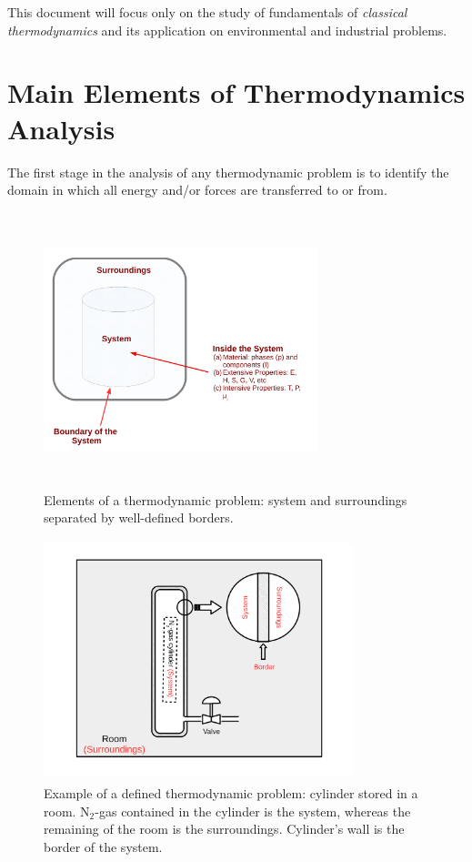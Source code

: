    This document will focus only on the study of fundamentals of {\it classical thermodynamics} and its application on environmental and industrial problems. 

   \section{Main Elements of Thermodynamics Analysis}\label{Chapter:Introduction:Section:ThermodAnalysis}

   The first stage in the analysis of any thermodynamic problem is to identify the domain in which all energy and/or forces are transferred to or from.
   
   \begin{figure}[h]
     \begin{center}
       \includegraphics[width=8cm, height=8cm]{./../Pics/Fig_SystemDefinition}
       \caption{Elements of a thermodynamic problem: system and surroundings separated by well-defined borders.}\label{Chapter:Introduction:Fig:Domain}
     \end{center}
   \end{figure}
   
   \begin{figure}[h]
     \begin{center}
       \includegraphics[width=9cm, height=7cm]{./../Pics/Fig_SystemDefinition2}
        \caption{Example of a defined thermodynamic problem: cylinder stored in a room. N$_{2}$-gas contained in the cylinder is the system, whereas the remaining of the room is the surroundings. Cylinder's wall is the border of the system.}\label{Chapter:Introduction:Fig:Domain2}
     \end{center}
   \end{figure}
   
